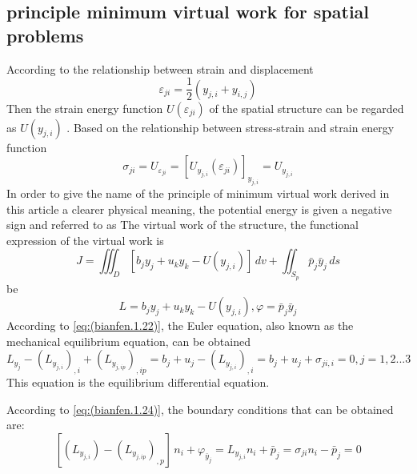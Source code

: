 \subsection {principle minimum virtual work for spatial problems}
According to the relationship between strain and displacement
\begin{equation}\label{eq:(zxxgyl.1.1)}
\varepsilon_{ji}=\frac{1}{2}(y_{j,i}+y_{i,j})
\end{equation}
Then the strain energy function $ U (\varepsilon_ {ji}) $ of the spatial structure can be regarded as $ U (y_ {j, i}) $ . Based on the relationship between stress-strain and strain energy function
\begin{equation}\label{eq:(zxxgyl.1.2)}
\sigma_{ji}=U_{\varepsilon_{ji}} =[U_{y_{j,i}}(\varepsilon_{ji})]_{y_{j,i}}=U_{y_{j,i}}
\end{equation}
In order to give the name of the principle of minimum virtual work derived in this article a clearer physical meaning, the potential energy is given a negative sign and referred to as
The virtual work of the structure, the functional expression of the virtual work is
\begin{equation}\label{eq:(zxxgyl.1.3)}
J = \iiint_D [b_j y_j+u_k y_k-U(y_{j,i})] \,dv+\iint_{S_{p}} \bar {p}_j  \bar {y}_j \,ds
\end{equation}
be
\begin{equation}\label{eq:(zxxgyl.1.4)}
L = b_j y_j+u_k y_k-U(y_{j,i}), \varphi=\bar {p}_j  \bar {y}_j
\end{equation}
According to \ref{eq:(bianfen.1.22)}, the Euler equation, also known as the mechanical equilibrium equation, can be obtained
\begin{equation} \label{eq:(zxxgyl.1.5)}    
L_{y_j} - \left(L_{y_{j,i}}\right)_{,i}+\left(L_{y_{j,ip}}\right)_{,ip} =
b_j+u_j-(L_{y_{j,i}})_{,i}=
b_j+u_j+\sigma_{ji,i}
=0,j=1,2...3
\end{equation}
This equation is the equilibrium differential equation.

According to \ref{eq:(bianfen.1.24)}, the boundary conditions that can be obtained are:
\begin{equation} \label{eq:(zxxgyl.1.6)}    
[\left(L_{y_{j,i}}  \right) -\left(L_{y_{j,ip}}\right)_{,p}]\,n_i + \varphi_{\bar {y}_j } 
=L_{y_{j,i}}n_i+\bar {p}_j  
=\sigma_ {ji}n_i -\bar {p}_j =0
\end{equation}

